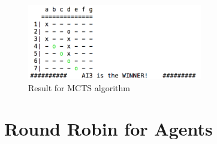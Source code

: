 \documentclass[12pt,a4paper]{article}
\begin{document}
\begin{figure}[H]
\centering\includegraphics[width=3in]{ai3.png}
\caption{Result for MCTS algorithm}
\end{figure}


\section{Round Robin for Agents}




\end{document}
